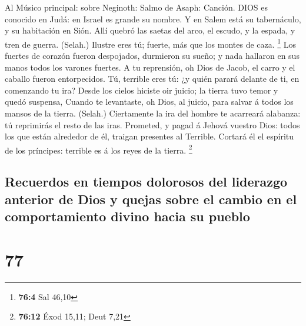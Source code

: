  Al Músico principal: sobre Neginoth: Salmo de Asaph:
Canción. DIOS es conocido en Judá: en Israel es grande su nombre.
 Y en Salem está su tabernáculo, y su habitación en Sión.
 Allí quebró las saetas del arco, el escudo, y la espada, y
tren de guerra. (Selah.)  Ilustre eres tú; fuerte, más que
los montes de caza. \footnote{\textbf{76:4} Sal 46,10}  Los
fuertes de corazón fueron despojados, durmieron su sueño; y nada
hallaron en sus manos todos los varones fuertes.  A tu
reprensión, oh Dios de Jacob, el carro y el caballo fueron entorpecidos.
 Tú, terrible eres tú: ¿y quién parará delante de ti, en
comenzando tu ira?  Desde los cielos hiciste oir juicio; la
tierra tuvo temor y quedó suspensa,  Cuando te levantaste,
oh Dios, al juicio, para salvar á todos los mansos de la tierra.
(Selah.)  Ciertamente la ira del hombre te acarreará
alabanza: tú reprimirás el resto de las iras.  Prometed, y
pagad á Jehová vuestro Dios: todos los que están alrededor de él,
traigan presentes al Terrible.  Cortará él el espíritu de
los príncipes: terrible es á los reyes de la tierra. \footnote{\textbf{76:12}
  Éxod 15,11; Deut 7,21}

\hypertarget{recuerdos-en-tiempos-dolorosos-del-liderazgo-anterior-de-dios-y-quejas-sobre-el-cambio-en-el-comportamiento-divino-hacia-su-pueblo}{%
\subsection{Recuerdos en tiempos dolorosos del liderazgo anterior de
Dios y quejas sobre el cambio en el comportamiento divino hacia su
pueblo}\label{recuerdos-en-tiempos-dolorosos-del-liderazgo-anterior-de-dios-y-quejas-sobre-el-cambio-en-el-comportamiento-divino-hacia-su-pueblo}}

\hypertarget{section-76}{%
\section{77}\label{section-76}}


